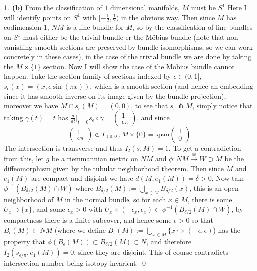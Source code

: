 \documentclass[10.5pt]{article}
\theoremstyle{definition}
\newtheorem{pb}{}
\newcommand{\set}[1]{\{#1\}}
\begin{document}
\begin{pb}
        \textbf{(b)} From the classification of \(1\) dimensional manifolds, \(M\) must be \(S^1\) Here I will identify points on \(S^1\) with \([-\frac12,\frac12)\) in the obvious way. Then since \(M\) has codimension \(1\), \(NM\) is a line bundle for \(M\), so by the classification of line bundles on \(S^1\) must either be the trivial bundle or the M\"obius bundle (note that non-vanishing smooth sections are preserved by bundle isomorphisms, so we can work concretely in these cases), in the case of the trivial bundle we are done by taking the \(M \times \set{1}\) section. Now I will show the case of the M\"obius bundle cannot happen. Take the section family of sections indexed by \(\epsilon \in (0,1]\), \(s_\epsilon(x) = (x,\epsilon\sin(\pi x))\), which is a smooth section (and hence an embedding since it has smooth inverse on its image given by the bundle projection), moreover we have \(M \cap s_\epsilon(M) = (0,0)\), to see that \(s_\epsilon \pitchfork M\), simply notice that taking \(\gamma(t) = t\) has \(\frac{d}{dt}\vert_{t=0}s_\epsilon\circ\gamma = \begin{pmatrix} 1 \\ \epsilon\pi \end{pmatrix}\), and since \[\begin{pmatrix} 1 \\ \epsilon\pi \end{pmatrix} \not \in T_{(0,0)}M\times\set{0} = \text{span}\begin{pmatrix}
            1 \\0
        \end{pmatrix}\]
        The intersection is transverse and thus \(I_2(s,M) = 1\). To get a contradiction from this, let \(g\) be a riemmannian metric on \(NM\) and \(\phi: NM \overset{\cong}{\longrightarrow} W \supset M\) be the diffeomorphism given by the tubular neighborhood theorem. Then since \(M\) and \(e_1(M)\) are compact and disjoint we have \(d(M,e_1(M)) = \delta > 0\), Now take \(\phi^{-1}(B_{\delta/2}(M) \cap W)\) where \(B_{\delta/2}(M) := \bigcup_{x \in M} B_{\delta/2}(x)\), this is an open neighborhood of \(M\) in the normal bundle, so for each \(x \in M\), there is some \(U_x \supset \set{x}\), and some \(\epsilon_x > 0\) with \(U_x \times (-\epsilon_x,\epsilon_x) \subset \phi^{-1}(B_{\delta/2}(M) \cap W)\), by compactness there is a finite subcover, and hence some \(\epsilon > 0\) so that \(B_\epsilon(M) \subset NM\) (where we define \(B_\epsilon(M) := \bigcup_{x \in M}\set{x}\times(-\epsilon,\epsilon)\)) has the property that \(\phi(B_\epsilon(M)) \subset B_{\delta/2}(M) \subset N\), and therefore \(I_2(s_{\epsilon/\pi},e_1(M)) = 0\), since they are disjoint. This of course contradicts intersection number being isotopy invarient. \qed
        

\end{pb}
\end{document}
